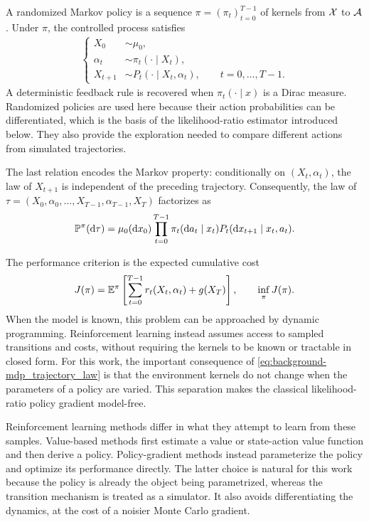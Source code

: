 A randomized Markov policy is a sequence $\pi=(\pi_t)_{t=0}^{T-1}$ of kernels from ${\cal X}$ to ${\cal A}$. Under $\pi$, the controlled process satisfies
\begin{align}
    \label{eq:background-mdp_dynamics}
    \begin{cases}
        X_0 &\sim \mu_0,\\
        \alpha_t &\sim \pi_t(\cdot\mid X_t),\\
        X_{t+1} &\sim P_t(\cdot\mid X_t,\alpha_t), \qquad t=0,\ldots,T-1.
    \end{cases}
\end{align}
A deterministic feedback rule is recovered when $\pi_t(\cdot\mid x)$ is a Dirac measure. Randomized policies are used here because their action probabilities can be differentiated, which is the basis of the likelihood-ratio estimator introduced below. They also provide the exploration needed to compare different actions from simulated trajectories.

The last relation encodes the Markov property: conditionally on $(X_t,\alpha_t)$, the law of $X_{t+1}$ is independent of the preceding trajectory. Consequently, the law of $\tau=(X_0,\alpha_0,\ldots,X_{T-1},\alpha_{T-1},X_T)$ factorizes as
\begin{align}
    \label{eq:background-mdp_trajectory_law}
    \mathbb{P}^\pi(\mathrm{d}\tau) = \mu_0(\mathrm{d} x_0) \prod_{t=0}^{T-1}\pi_t(\mathrm{d} a_t\mid x_t) P_t(\mathrm{d} x_{t+1}\mid x_t,a_t).
\end{align}

The performance criterion is the expected cumulative cost
\begin{align}
    \label{eq:background-mdp_objective}
    J(\pi) = \mathbb{E}^\pi\left[\sum_{t=0}^{T-1} r_t(X_t,\alpha_t) + g(X_T) \right], \qquad \inf_\pi J(\pi).
\end{align}
When the model is known, this problem can be approached by dynamic programming. Reinforcement learning instead assumes access to sampled transitions and costs, without requiring the kernels to be known or tractable in closed form. For this work, the important consequence of \eqref{eq:background-mdp_trajectory_law} is that the environment kernels do not change when the parameters of a policy are varied. This separation makes the classical likelihood-ratio policy gradient model-free.

Reinforcement learning methods differ in what they attempt to learn from these samples. Value-based methods first estimate a value or state-action value function and then derive a policy. Policy-gradient methods instead parameterize the policy and optimize its performance directly. The latter choice is natural for this work because the policy is already the object being parametrized, whereas the transition mechanism is treated as a simulator. It also avoids differentiating the dynamics, at the cost of a noisier Monte Carlo gradient.

